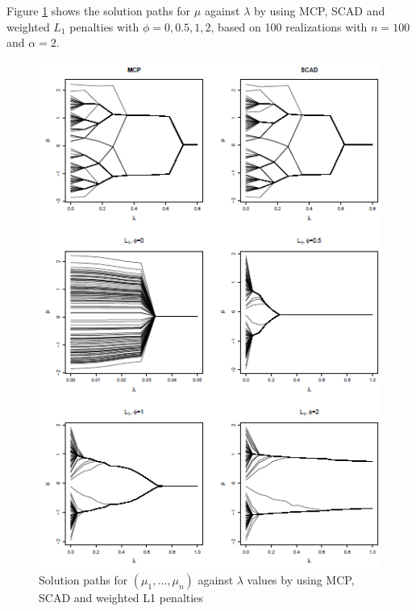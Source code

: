 \documentclass[review]{elsarticle}
\begin{document}
Figure \ref{fig:1} shows the solution paths for $\mu$ against $\lambda$ by using MCP, SCAD and weighted $L_1$ penalties with $\phi=0,0.5,1,2$, based on 100 realizations with $n=100$ and $\alpha=2$. 
\begin{figure}
\caption{Solution paths for $(\mu_1,...,\mu_n)$ against $\lambda$ values by using MCP, SCAD and weighted L1 penalties}
\label{fig:1}
\centering
\includegraphics[width=.8\textwidth]{solution_path.png}
\end{figure}
\end{document}
